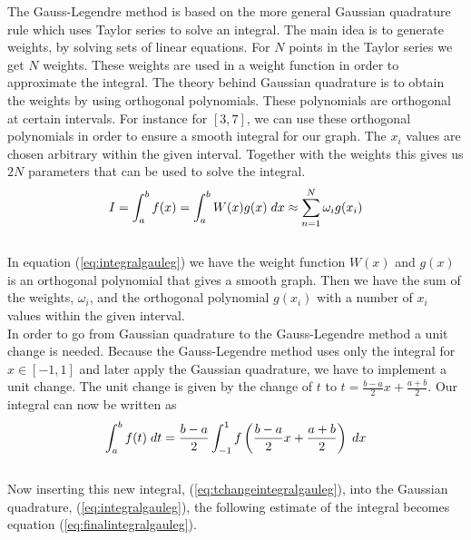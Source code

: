 \documentclass{article}
\begin{document}
The Gauss-Legendre method is based on the more general Gaussian quadrature rule which uses Taylor series to solve an integral. The main idea is to generate weights, by solving sets of linear equations. For $N$ points in the Taylor series we get $N$ weights. These weights are used in a weight function in order to approximate the integral. The theory behind Gaussian quadrature is to obtain the weights by using orthogonal polynomials. These polynomials are orthogonal at certain intervals. For instance for $[3,7]$, we can use these orthogonal polynomials in order to ensure a smooth integral for our graph. The $x_i$ values are chosen arbitrary within the given interval. Together with the weights this gives us $2N$ parameters that can be used to solve the integral. \\

\begin{equation} \label{eq:integralgauleg}
    I = \int_{a}^{b} f(x) = \int_{a}^{b}W(x)g(x) \hspace{1mm} dx \approx  \sum_{n=1}^{N}  \omega_i g(x_i)
\end{equation} \\

In equation (\ref{eq:integralgauleg}) we have the weight function $W(x)$ and $g(x)$ is an orthogonal polynomial that gives a smooth graph. Then we have the sum of the weights, $\omega_i$, and the orthogonal polynomial $g(x_i)$ with a number of $x_i$ values within the given interval. \\

In order to go from Gaussian quadrature to the Gauss-Legendre method a unit change is needed. Because the Gauss-Legendre method uses only the integral for $ x \in [-1,1]$ and later apply the Gaussian quadrature, we have to implement a unit change. The unit change is given by the change of $t$ to $t = \frac{b-a}{2}x + \frac{a+b}{2}$. Our integral can now be written as \\

\begin{equation} \label{eq:tchangeintegralgauleg}
    \int_{a}^{b} f(t) \hspace{1mm} dt = \frac{b-a}{2}\int_{-1}^{1} f \left( \frac{b-a}{2}x + \frac{a+b}{2} \right) \hspace{1mm} dx
\end{equation} \\

Now inserting this new integral, (\ref{eq:tchangeintegralgauleg}), into the Gaussian quadrature, (\ref{eq:integralgauleg}), the following estimate of the integral becomes equation (\ref{eq:finalintegralgauleg}). \\
\end{document}
